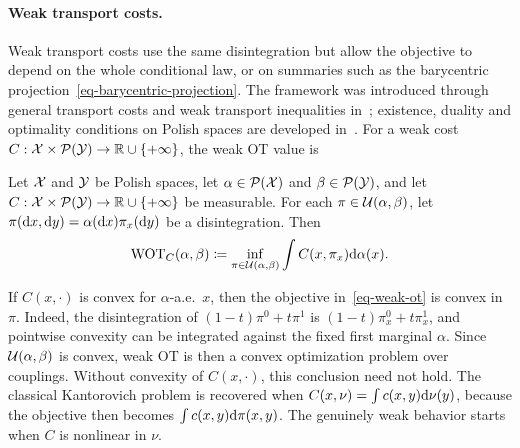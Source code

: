 \paragraph{Weak transport costs.}
Weak transport costs use the same disintegration but allow the objective to depend on the whole conditional law, or on summaries such as the barycentric projection~\eqref{eq-barycentric-projection}. The framework was introduced through general transport costs and weak transport inequalities in~\cite{gozlan2017kantorovich}; existence, duality and optimality conditions on Polish spaces are developed in~\cite{backhoff2019weak}. For a weak cost $C:\mathcal{X}\times\mathcal{P}(\mathcal{Y})\to\mathbb{R}\cup\{+\infty\}$, the weak OT value is
\begin{defn}\label{def-weak-optimal-transport}
Let $\mathcal{X}$ and $\mathcal{Y}$ be Polish spaces, let $\alpha\in\mathcal{P}(\mathcal{X})$ and $\beta\in\mathcal{P}(\mathcal{Y})$, and let $C:\mathcal{X}\times\mathcal{P}(\mathcal{Y})\to\mathbb{R}\cup\{+\infty\}$ be measurable. For each $\pi\in\mathcal{U}(\alpha,\beta)$, let
$\pi(\mathrm{d} x,\mathrm{d} y)=\alpha(\mathrm{d} x)\pi_x(\mathrm{d} y)$ be a disintegration. Then
\begin{equation}\label{eq-weak-ot}
	\operatorname{WOT}_C(\alpha,\beta)
	\coloneqq
	\inf_{\pi\in\mathcal{U}(\alpha,\beta)}
	\int C(x,\pi_x)\mathrm{d}\alpha(x).
\end{equation}
\end{defn}
If $C(x,\cdot)$ is convex for $\alpha$-a.e.\ $x$, then the objective in~\eqref{eq-weak-ot} is convex in $\pi$. Indeed, the disintegration of $(1-t)\pi^0+t\pi^1$ is $(1-t)\pi_x^0+t\pi_x^1$, and pointwise convexity can be integrated against the fixed first marginal $\alpha$. Since $\mathcal{U}(\alpha,\beta)$ is convex, weak OT is then a convex optimization problem over couplings. Without convexity of $C(x,\cdot)$, this conclusion need not hold. The classical Kantorovich problem is recovered when $C(x,\nu)=\int c(x,y)\mathrm{d}\nu(y)$, because the objective then becomes $\int c(x,y)\mathrm{d}\pi(x,y)$. The genuinely weak behavior starts when $C$ is nonlinear in $\nu$.

